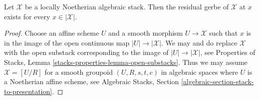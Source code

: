 \begin{lemma}
\label{lemma-every-point-residual-gerbe-locally-Noetherian}
Let $\mathcal{X}$ be a locally Noetherian algebraic stack.
Then the residual gerbe of $\mathcal{X}$ at $x$ exists for
every $x \in |\mathcal{X}|$.
\end{lemma}

\begin{proof}
Choose an affine scheme $U$ and a smooth morphism $U \to \mathcal{X}$
such that $x$ is in the image of the open continuous map
$|U| \to |\mathcal{X}|$. We may and do replace $\mathcal{X}$
with the open substack corresponding to the image of $|U| \to |\mathcal{X}|$,
see Properties of Stacks, Lemma \ref{stacks-properties-lemma-open-substacks}.
Thus we may assume $\mathcal{X} = [U/R]$ for a smooth
groupoid $(U, R, s, t, c)$ in algebraic spaces
where $U$ is a Noetherian affine scheme, see
Algebraic Stacks, Section \ref{algebraic-section-stack-to-presentation}.


\end{proof}
